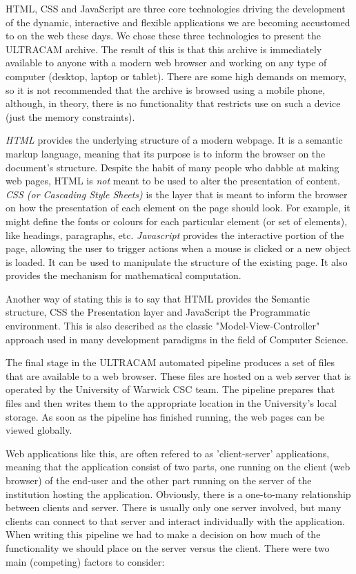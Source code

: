 HTML, CSS and JavaScript are three core technologies driving the development of the dynamic, interactive and flexible applications we are becoming accustomed to on the web these days. We chose these three technologies to present the ULTRACAM archive. The result of this is that this archive is immediately available to anyone with a modern web browser and working on any type of computer (desktop, laptop or tablet). There are some high demands on memory, so it is not recommended that the archive is browsed using a mobile phone, although, in theory, there is no functionality that restricts use on such a device (just the memory constraints). 

\emph{HTML} provides the underlying structure of a modern webpage. It is a semantic markup language, meaning that its purpose is to inform the browser on the document's structure. Despite the habit of many people who dabble at making web pages, HTML is \emph{not} meant to be used to alter the presentation of content. \emph{CSS (or Cascading Style Sheets)} is the layer that is meant to inform the browser on how the presentation of each element on the page should look. For example, it might define the fonts or colours for each particular element (or set of elements), like headings, paragraphs, etc. \emph{Javascript} provides the interactive portion of the page, allowing the user to trigger actions when a mouse is clicked or a new object is loaded. It can be used to manipulate the structure of the existing page. It also provides the mechanism for mathematical computation.

Another way of stating this is to say that HTML provides the Semantic structure, CSS the Presentation layer and JavaScript the Programmatic environment. This is also described as the classic "Model-View-Controller" approach used in many development paradigms in the field of Computer Science.

The final stage in the ULTRACAM automated pipeline produces a set of files that are available to a web browser. These files are hosted on a web server that is operated by the University of Warwick CSC team. The pipeline prepares that files and then writes them to the appropriate location in the University's local storage. As soon as the pipeline has finished running, the web pages can be viewed globally. 

Web applications like this, are often refered to as 'client-server' applications, meaning that the application consist of two parts, one running on the client (web browser) of the end-user and the other part running on the server of the institution hosting the application. Obviously, there is a one-to-many relationship between clients and server. There is usually only one server involved, but many clients can connect to that server and interact individually with the application. When writing this pipeline we had to make a decision on how much of the functionality we should place on the server versus the client. There were two main (competing) factors to consider:


